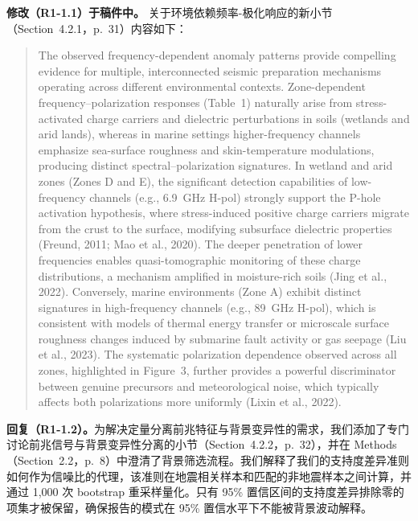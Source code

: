 \documentclass[12pt]{article}
\newcommand{\revresponse}[1]{\begingroup\color{responsecolor}#1\endgroup}
\newcommand{\revchange}[1]{\begingroup\color{changecolor}#1\endgroup}
\begin{document}
\revchange{%
\textbf{修改（R1-1.1）于稿件中。}
关于环境依赖频率-极化响应的新小节（Section~4.2.1，p.~31）内容如下：

\begin{quote}
The observed frequency-dependent anomaly patterns provide compelling evidence for multiple, interconnected seismic preparation mechanisms operating across different environmental contexts. Zone-dependent frequency--polarization responses (Table~1) naturally arise from stress-activated charge carriers and dielectric perturbations in soils (wetlands and arid lands), whereas in marine settings higher-frequency channels emphasize sea-surface roughness and skin-temperature modulations, producing distinct spectral--polarization signatures. In wetland and arid zones (Zones D and E), the significant detection capabilities of low-frequency channels (e.g., 6.9~GHz H-pol) strongly support the P-hole activation hypothesis, where stress-induced positive charge carriers migrate from the crust to the surface, modifying subsurface dielectric properties (Freund, 2011; Mao et al., 2020). The deeper penetration of lower frequencies enables quasi-tomographic monitoring of these charge distributions, a mechanism amplified in moisture-rich soils (Jing et al., 2022). Conversely, marine environments (Zone A) exhibit distinct signatures in high-frequency channels (e.g., 89~GHz H-pol), which is consistent with models of thermal energy transfer or microscale surface roughness changes induced by submarine fault activity or gas seepage (Liu et al., 2023). The systematic polarization dependence observed across all zones, highlighted in Figure~3, further provides a powerful discriminator between genuine precursors and meteorological noise, which typically affects both polarizations more uniformly (Lixin et al., 2022).
\end{quote}
}

\revresponse{%
\textbf{回复（R1-1.2）。}为解决定量分离前兆特征与背景变异性的需求，我们添加了专门讨论前兆信号与背景变异性分离的小节（Section~4.2.2，p.~32），并在 Methods（Section~2.2，p.~8）中澄清了背景筛选流程。我们解释了我们的支持度差异准则如何作为信噪比的代理，该准则在地震相关样本和匹配的非地震样本之间计算，并通过 1,000 次 bootstrap 重采样量化。只有 95\% 置信区间的支持度差异排除零的项集才被保留，确保报告的模式在 95\% 置信水平下不能被背景波动解释。
}
\end{document}
